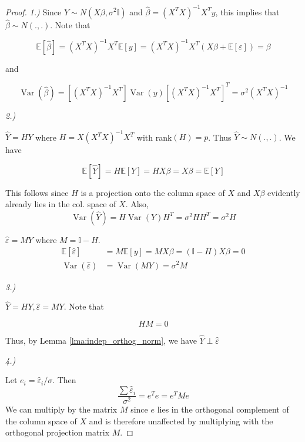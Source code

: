 \documentclass[11pt, %
	oneside, %
	english, %
	onehalfspacing, %
	]{article} %
\numberwithin{equation}{section}
\begin{document}
\begin{proof}

    \emph{1.)}
    Since $Y \sim N(X \beta, \sigma^2 \mathbb{I})$ and $\hat{\beta}=(X^T X)^{-1} X^T y$, this implies that $\hat{\beta} \sim N(.,.)$. Note that

$$
\mathbb{E} \left[ \hat{\beta}\right] = (X^T X)^{-1} X^T \mathbb{E} \left[ y\right] = (X^TX)^{-1} X^T (X \beta + \mathbb{E} \left[ \varepsilon\right]) = \beta
$$

and

$$
\operatorname{Var} \left( \hat{\beta}\right)= \left[ (X^TX)^{-1} X^T \right] \operatorname{Var} \left( y\right) \left[ (X^TX)^{-1} X^T \right]^T = \sigma^2 (X^T X)^{-1}
$$

\emph{2.)}

$\hat{Y} = HY$ where $H = X(X^TX) ^{-1}X^T$ with rank$(H) = p$. Thus $\hat{Y} \sim N(.,.)$.  We have

$$
\mathbb{E} \left[ \hat{Y}\right] = H \mathbb{E} \left[ Y\right] = HX\beta = X \beta = \mathbb{E} \left[ Y\right]
$$

This follows since $H$ is a projection onto the column space of $X$ and $X \beta$ evidently already lies in the col. space of $X$. Also,
$$
\operatorname{Var} \left( \hat{Y}\right) = H \operatorname{Var} \left( Y\right) H^T = \sigma^2 H H^T = \sigma^2 H
$$

$\hat{\varepsilon} = MY$ where $M = \mathbb{I}-H$.
\begin{align*}
    \mathbb{E} \left[ \hat{\varepsilon}\right] &= M \mathbb{E} \left[ y\right] = MX\beta = (\mathbb{I}-H) X \beta = 0 \\
    \operatorname{Var} \left( \hat{\varepsilon}\right) &= \operatorname{Var} \left( MY\right) = \sigma^2 M
\end{align*}

\emph{3.)}

$\hat{Y} = HY, \hat{\varepsilon} = MY$. Note that

$$
HM = 0
$$

Thus, by Lemma \ref{lma:indep_orthog_norm}, we have $\hat{Y} \perp \hat{\varepsilon}$

\emph{4.)}

Let $e_i = \hat{\varepsilon}_i / \sigma$. Then
$$
\frac{\sum \hat{\varepsilon}_i}{\sigma^2} = e^T e = e^T M e
$$
We can multiply by the matrix $M$ since $e$ lies in the orthogonal complement of the column space of $X$ and is therefore unaffected by multiplying with the orthogonal projection matrix $M$.


\end{proof}
\end{document}
